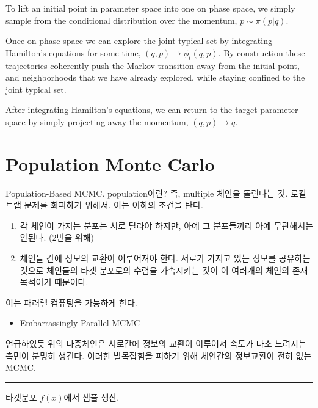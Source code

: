 \documentclass[
]{book}
\providecommand{\tightlist}{%
  \setlength{\itemsep}{0pt}\setlength{\parskip}{0pt}}
\begin{document}
To lift an initial point in parameter space into one on phase space, we simply sample from the conditional distribution over the momentum, \(p \sim \pi(p \vert q)\).

Once on phase space we can explore the joint typical set by integrating Hamilton's equations for some time, \((q,p) \rightarrow \phi_t (q,p)\). By construction these trajectories coherently push the Markov transition away from the initial point, and neighborhoods that we have already explored, while staying confined to the joint typical set.

After integrating Hamilton's equations, we can return to the target parameter space by simply projecting away the momentum, \((q,p) \rightarrow q\).

\hypertarget{population-monte-carlo}{%
\section{Population Monte Carlo}\label{population-monte-carlo}}

Population-Based MCMC. population이란? 즉, multiple 체인을 돌린다는 것. 로컬 트랩 문제를 회피하기 위해서. 이는 이하의 조건을 탄다.

\begin{enumerate}
\def\labelenumi{\arabic{enumi}.}
\tightlist
\item
  각 체인이 가지는 분포는 서로 달라야 하지만, 아예 그 분포들끼리 아예 무관해서는 안된다. (2번을 위해)
\item
  체인들 간에 정보의 교환이 이루어져야 한다. 서로가 가지고 있는 정보를 공유하는 것으로 체인들의 타겟 분포로의 수렴을 가속시키는 것이 이 여러개의 체인의 존재 목적이기 때문이다.
\end{enumerate}

이는 패러렐 컴퓨팅을 가능하게 한다.

\begin{itemize}
\tightlist
\item
  Embarrassingly Parallel MCMC
\end{itemize}

언급하였듯 위의 다중체인은 서로간에 정보의 교환이 이루어져 속도가 다소 느려지는 측면이 분명히 생긴다. 이러한 발목잡힘을 피하기 위해 체인간의 정보교환이 전혀 없는 MCMC.

\begin{center}\rule{0.5\linewidth}{0.5pt}\end{center}

타겟분포 \(f(x)\)에서 샘플 생산.
\end{document}
